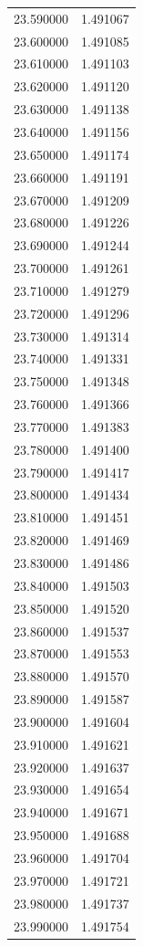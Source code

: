 \begin{tabular}{rr}
23.590000 & 1.491067 \\
23.600000 & 1.491085 \\
23.610000 & 1.491103 \\
23.620000 & 1.491120 \\
23.630000 & 1.491138 \\
23.640000 & 1.491156 \\
23.650000 & 1.491174 \\
23.660000 & 1.491191 \\
23.670000 & 1.491209 \\
23.680000 & 1.491226 \\
23.690000 & 1.491244 \\
23.700000 & 1.491261 \\
23.710000 & 1.491279 \\
23.720000 & 1.491296 \\
23.730000 & 1.491314 \\
23.740000 & 1.491331 \\
23.750000 & 1.491348 \\
23.760000 & 1.491366 \\
23.770000 & 1.491383 \\
23.780000 & 1.491400 \\
23.790000 & 1.491417 \\
23.800000 & 1.491434 \\
23.810000 & 1.491451 \\
23.820000 & 1.491469 \\
23.830000 & 1.491486 \\
23.840000 & 1.491503 \\
23.850000 & 1.491520 \\
23.860000 & 1.491537 \\
23.870000 & 1.491553 \\
23.880000 & 1.491570 \\
23.890000 & 1.491587 \\
23.900000 & 1.491604 \\
23.910000 & 1.491621 \\
23.920000 & 1.491637 \\
23.930000 & 1.491654 \\
23.940000 & 1.491671 \\
23.950000 & 1.491688 \\
23.960000 & 1.491704 \\
23.970000 & 1.491721 \\
23.980000 & 1.491737 \\
23.990000 & 1.491754 \\

\end{tabular}
